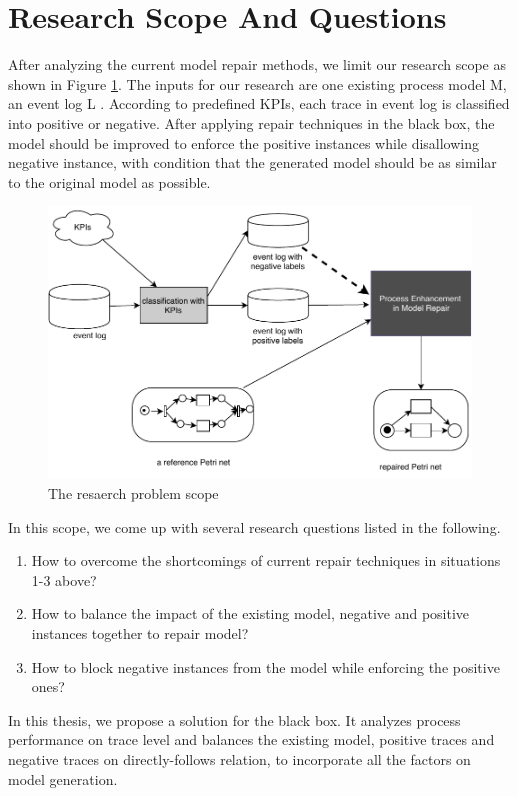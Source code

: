 \section{Research Scope And Questions }
After analyzing the current model repair methods, we limit our research scope as shown in Figure \ref{fig:scope}.  The inputs for our research are one existing process model M, an event log L . According to predefined KPIs, each trace in event log is classified into positive or negative. After applying repair techniques in the black box, the model should be improved to enforce the positive instances while disallowing negative instance, with condition that the generated model should be as similar to the original model as possible. 
\begin{figure}
	\centering
	\includegraphics[width=\textwidth]{figures/introduction/P06-problem-scope.pdf}
	\caption{The resaerch problem scope}
	\label{fig:scope}
\end{figure}

In this scope, we come up with several research questions listed in the following.
\begin{enumerate}[start=1,label={\bfseries{ RQ\arabic*:}}]
	\item How to overcome the shortcomings of current repair techniques in situations 1-3 above?
	\item How to balance the impact of the existing model, negative and positive instances together to repair model? 
	\item How to block negative instances from the model while enforcing the positive ones?
\end{enumerate}
  
In this thesis, we propose a solution for the black box. It analyzes process performance on trace level and balances the existing model, positive traces and negative traces on directly-follows relation, to incorporate all the factors on model generation. 

